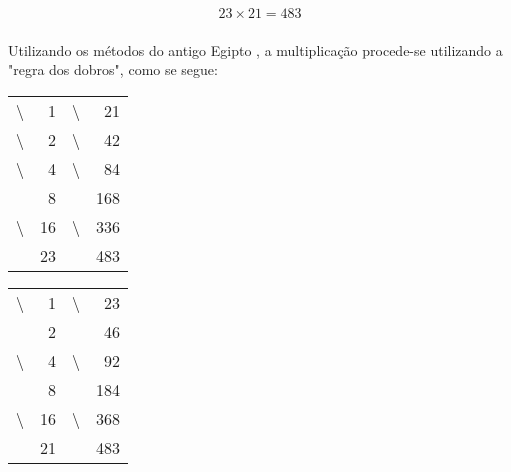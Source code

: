 
\begin{align*}
	23 \times 21 = 483
\end{align*}

\paragraph{} Utilizando os métodos do antigo Egipto
\parencite[na pág. 28]{Estrada2000}, a multiplicação procede-se utilizando a
"regra dos dobros", como se segue:

\vspace{0.5cm}

\begin{minipage}{0.5\textwidth}
	\centering
	\begin{tabular}{cr|cr}
		\textbackslash&1&\textbackslash&21\\
		\textbackslash&2&\textbackslash&42\\
		\textbackslash&4&\textbackslash&84\\
		&8&&168\\
		\textbackslash&16&\textbackslash&336\\
		\hline
		&23&&483
	\end{tabular}
\end{minipage}
\begin{minipage}{0.5\textwidth}
	\centering
	\begin{tabular}{cr|cr}
		\textbackslash&1&\textbackslash&23\\
		&2&&46\\
		\textbackslash&4&\textbackslash&92\\
		&8&&184\\
		\textbackslash&16&\textbackslash&368\\
		\hline
		&21&&483
	\end{tabular}
\end{minipage}
